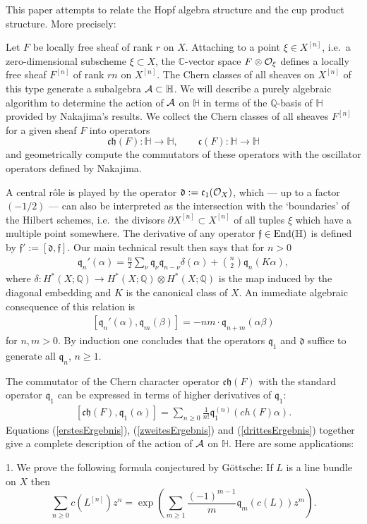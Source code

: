 \documentclass[twoside,11pt]{article}
\newcommand{\beeq}[1]{\begin{eqnarray}\label{#1}}
\newcommand{\eneq}{\end{eqnarray}}
\newcommand{\ka}{{\cal A}}
\newcommand{\ko}{{\cal O}}
\newcommand{\IC}{{\mathbb C}}
\newcommand{\IH}{{\mathbb H}}
\newcommand{\IQ}{{\mathbb Q}}
\newcommand{\gothc}{{\mathfrak c}}
\newcommand{\gothd}{{\mathfrak d}}
\newcommand{\gothf}{{\mathfrak f}}
\newcommand{\gothh}{{\mathfrak h}}
\newcommand{\gothq}{{\mathfrak q}}
\newcommand{\tensor}{\otimes}
\newcommand{\End}{{\rm End}}
\newcommand{\cc}{\gothc}
\newcommand{\dd}{\gothd}
\newcommand{\qq}{\gothq}
\newcommand{\ch}{{\gothc\gothh}}
\begin{document}
This paper attempts to relate
the Hopf algebra structure and the cup product structure. More precisely:

Let $F$ be locally free sheaf of rank $r$ on $X$. Attaching to a point
$\xi\in X^{[n]}$, i.e.\ a zero-dimensional subscheme $\xi\subset X$, the
$\IC$-vector space $F\tensor \ko_\xi$ defines a locally free sheaf $F^{[n]}$
of rank $rn$ on $X^{[n]}$. The Chern classes of all sheaves on $X^{[n]}$
of this type generate a subalgebra $\ka\subset\IH$. We will describe a
purely algebraic
algorithm to determine the action of $\ka$ on $\IH$ in terms of the $\IQ$-basis
of $\IH$ provided by Nakajima's results.
We collect the Chern classes of all sheaves $F^{[n]}$ for
a given sheaf $F$ into operators
$$\ch(F):\IH\to \IH,\qquad\cc(F):\IH\to\IH$$
and geometrically compute the commutators of these operators with the
oscillator operators defined by Nakajima. 

A central r\^ole is played by the operator $\dd:=\cc_1(\ko_X)$, which ---
up to a factor $(-1/2)$ --- can also be interpreted as the intersection with
the `boundaries' of the Hilbert schemes, i.e.\ the divisors $\partial X^{[n]}\subset X^{[n]}$ of all tuples $\xi$ which have a multiple point somewhere. The 
derivative of any operator $\gothf\in\End(\IH)$ is defined by $\gothf':=
[\dd,\gothf]$. Our main technical result then says that for $n>0$
\beeq{erstesErgebnis}
\qq_n'(\alpha)=\frac{n}{2}\sum_{\nu}\qq_\nu\qq_{n-\nu}\delta(\alpha)+\binom{n}{2}\qq_n(K\alpha),
\eneq
where $\delta:H^*(X;\IQ)\to H^*(X;\IQ)\tensor H^*(X;\IQ)$ is the map induced 
by the diagonal embedding and $K$ is the canonical class of $X$. An immediate 
algebraic consequence of this relation is
\beeq{zweitesErgebnis}
[\qq_n'(\alpha),\qq_m(\beta)]=-nm\cdot\qq_{n+m}(\alpha\beta)
\eneq
for $n,m>0$. By induction one concludes that the operators $\qq_1$ and $\dd$
suffice to generate all $\qq_n$, $n\geq 1$. 

The commutator of the Chern character operator $\ch(F)$ with the 
standard operator $\qq_1$ can be expressed in terms of higher derivatives of 
$\qq_1$:
\beeq{drittesErgebnis}
[\ch(F),\qq_1(\alpha)]=\sum_{n\geq0}\frac{1}{n!}\qq_1^{(n)}(ch(F)\alpha).
\eneq
Equations (\ref{erstesErgebnis}), (\ref{zweitesErgebnis}) and (\ref{drittesErgebnis}) together give a complete description of the action of 
$\ka$ on $\IH$. Here are some applications:

1. We prove the following formula conjectured by G\"ottsche:
If $L$ is a line bundle on $X$ then
$$\sum_{n\geq0}c(L^{[n]})z^n=\exp\left(\sum_{m\geq1}\frac{(-1)^{m-1}}{m}\qq_m(c(L))z^m\right).$$
\end{document}
